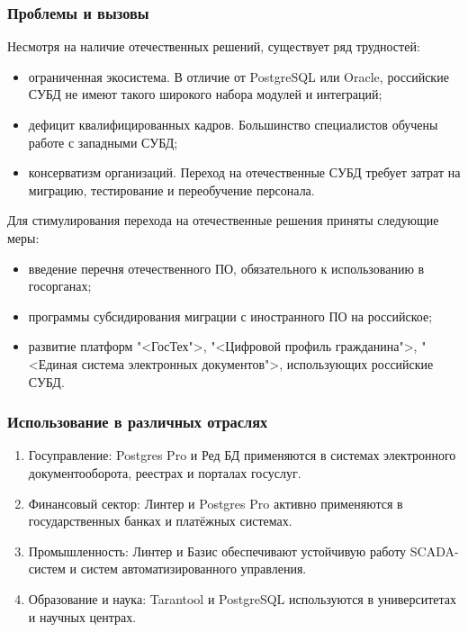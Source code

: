 \subsubsection{Проблемы и вызовы}

Несмотря на наличие отечественных решений, существует ряд трудностей:
\begin{itemize}
	\item ограниченная экосистема. В отличие от PostgreSQL или Oracle, российские СУБД не имеют такого широкого набора модулей и интеграций;
	\item дефицит квалифицированных кадров. Большинство специалистов обучены работе с западными СУБД;
	\item консерватизм организаций. Переход на отечественные СУБД требует затрат на миграцию, тестирование и переобучение персонала.
\end{itemize}

Для стимулирования перехода на отечественные решения приняты следующие меры:
\begin{itemize}
	\item введение перечня отечественного ПО, обязательного к использованию в госорганах;
	\item программы субсидирования миграции с иностранного ПО на российское;
	\item развитие платформ "<ГосТех">, "<Цифровой профиль гражданина">, "<Единая система электронных документов">, использующих российские СУБД.
\end{itemize}

\subsubsection{Использование в различных отраслях}

\begin{enumerate}
	\item Госуправление: Postgres Pro и Ред БД применяются в системах электронного документооборота, реестрах и порталах госуслуг.
	\item Финансовый сектор: Линтер и Postgres Pro активно применяются в государственных банках и платёжных системах.
	\item Промышленность: Линтер и Базис обеспечивают устойчивую работу SCADA-систем и систем автоматизированного управления.
	\item Образование и наука: Tarantool и PostgreSQL используются в университетах и научных центрах.
\end{enumerate}

